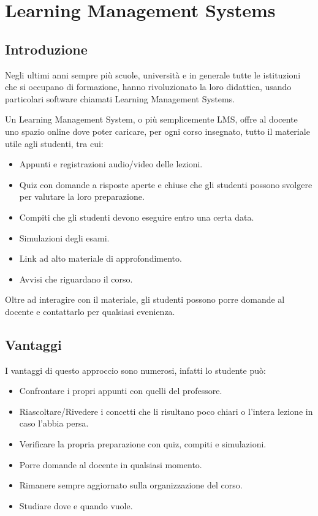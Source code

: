 \chapter{Learning Management Systems}

\section{Introduzione}

Negli ultimi anni sempre più scuole, università e in generale tutte le istituzioni che si occupano di formazione, hanno rivoluzionato la loro didattica, usando particolari software chiamati Learning Management Systems.

Un Learning Management System, o più semplicemente LMS, offre al docente uno spazio online dove poter caricare, per ogni corso insegnato, tutto il materiale utile agli studenti, tra cui:

\begin{itemize}

\item Appunti e registrazioni audio/video delle lezioni.
\item Quiz con domande a risposte aperte e chiuse che gli studenti possono svolgere per valutare la loro preparazione.
\item Compiti che gli studenti devono eseguire entro una certa data.
\item Simulazioni degli esami.
\item Link ad alto materiale di approfondimento.
\item Avvisi che riguardano il corso.

\end{itemize}

Oltre ad interagire con il materiale, gli studenti possono porre domande al docente e contattarlo per qualsiasi evenienza.

\cite{Talentlms}

\clearpage

\section{Vantaggi}

I vantaggi di questo approccio sono numerosi, infatti lo studente può:

\begin{itemize}

\item Confrontare i propri appunti con quelli del professore.
\item Riascoltare/Rivedere i concetti che li risultano poco chiari o l'intera lezione in caso l'abbia persa.
\item Verificare la propria preparazione con quiz, compiti e simulazioni.
\item Porre domande al docente in qualsiasi momento.
\item Rimanere sempre aggiornato sulla organizzazione del corso.
\item Studiare dove e quando vuole.

\end{itemize}


